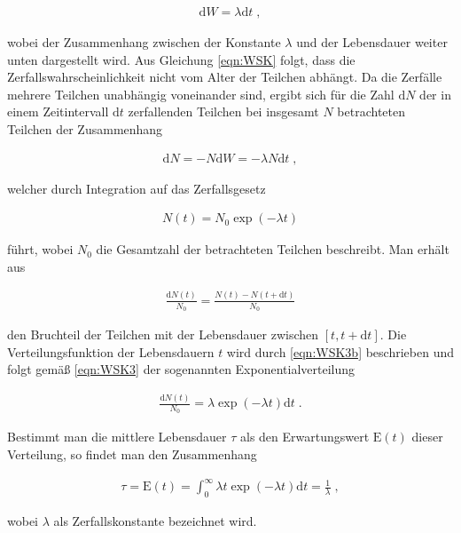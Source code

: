 \begin{align}
\textrm{d}W = \lambda \textrm{d}t \;, \label{eqn:WSK}
\end{align}

wobei der Zusammenhang zwischen der Konstante $\lambda$ und der Lebensdauer weiter unten dargestellt wird. Aus Gleichung \eqref{eqn:WSK} folgt, dass die Zerfallswahrscheinlichkeit nicht vom Alter der Teilchen abhängt. Da die Zerfälle mehrere Teilchen unabhängig voneinander sind, ergibt sich für die Zahl $\textrm{d}N$ der in einem Zeitintervall $\textrm{d}t$ zerfallenden Teilchen bei insgesamt $N$ betrachteten Teilchen der Zusammenhang

\begin{align}
\textrm{d}N = - N\textrm{d}W = - \lambda N \textrm{d}t \;, \label{eqn:WSK2}
\end{align}

welcher durch Integration auf das Zerfallsgesetz

\begin{align}
N(t) = N_0 \exp(-\lambda t) \label{eqn:WSK3}
\end{align}

führt, wobei $N_0$ die Gesamtzahl der betrachteten Teilchen beschreibt. Man erhält aus 

\begin{align}
\frac{\textrm{d} N\left(t\right)}{N_0} = \frac{N(t) - N\left(t+\textrm{d}t\right)}{N_0} \label{eqn:WSK3b}
\end{align}

den Bruchteil der Teilchen mit der Lebensdauer zwischen $[t, t + \textrm{d}t]$. Die Verteilungsfunktion der Lebensdauern $t$ wird durch \eqref{eqn:WSK3b} beschrieben und folgt gemäß \eqref{eqn:WSK3} der sogenannten Exponentialverteilung

\begin{align}
\frac{\textrm{d}N(t)}{N_0} = \lambda\exp(-\lambda t) \textrm{d}t \label{eqn:WSK4} \;.
\end{align}

Bestimmt man die mittlere Lebensdauer $\tau$ als den Erwartungswert $\textrm{E}(t)$ dieser Verteilung, so findet man den Zusammenhang

\begin{align}
\tau = \textrm{E}(t) = \int_0^{\infty} \lambda t \exp (-\lambda t) \textrm{d}t = \frac{1}{\lambda}\;,
\end{align}

wobei $\lambda$ als Zerfallskonstante bezeichnet wird. 

